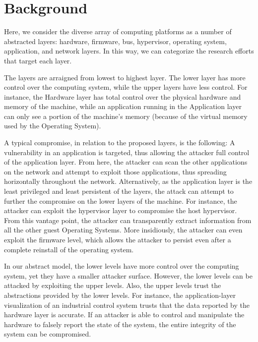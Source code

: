 \documentclass[11pt,letterpaper]{article}
\begin{document}
\section{Background}

Here, we consider the diverse array of computing platforms as a number
of abstracted layers: hardware, firmware, bus, hypervisor, operating
system, application, and network layers. In this way, we can
categorize the research efforts that target each layer.

The layers are arraigned from lowest to highest layer. The lower layer
has more control over the computing system, while the upper layers
have less control. For instance, the Hardware layer has total control
over the physical hardware and memory of the machine, while an
application running in the Application layer can only see a portion of
the machine's memory (because of the virtual memory used by the
Operating System).

A typical compromise, in relation to the proposed layers, is the
following: A vulnerability in an application is targeted, thus
allowing the attacker full control of the application layer. From
here, the attacker can scan the other applications on the network and
attempt to exploit those applications, thus spreading horizontally
throughout the network. Alternatively, as the application layer is the
least privileged and least persistent of the layers, the attack can
attempt to further the compromise on the lower layers of the machine.
For instance, the attacker can exploit the hypervisor layer to
compromise the host hypervisor. From this vantage point, the attacker
can transparently extract information from all the other guest
Operating Systems. More insidiously, the attacker can even exploit the
firmware level, which allows the attacker to persist even after
a complete reinstall of the operating system.

In our abstract model, the lower levels have more control over the
computing system, yet they have a smaller attacker surface. However,
the lower levels can be attacked by exploiting the upper levels. Also, the upper
levels trust the abstractions provided by the lower levels. For
instance, the application-layer visualization of an industrial control
system trusts that the data reported by the hardware layer is
accurate. If an attacker is able to control and manipulate the
hardware to falsely report the state of the system, the entire
integrity of the system can be compromised.
\end{document}

